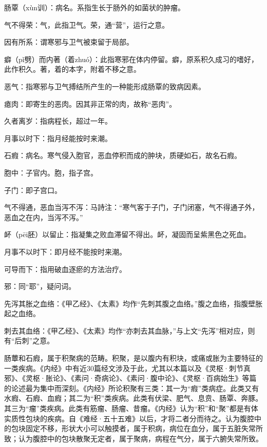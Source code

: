 \documentclass[draft,12pt]{ctexbook}
\begin{document}

\begin{jiaozhu}
  \item 肠覃（xùn训）：病名。系指生长于肠外的如菌状的肿瘤。
  \item 气不得荣：气，此指卫气。荣，通“营”，运行之意。
  \item 因有所系：谓寒邪与卫气被束留于局部。
  \item 癖（pǐ劈）而内著（着zhuó）：此指寒邪在体内停留。癖，原系积久成习的嗜好，此作积久。著，着的本字，附着不移之意。
  \item 恶气：指寒邪与卫气搏结所产生的一种能形成肠覃的致病因素。
  \item 瘜肉：即寄生的恶肉。因其非正常的肉，故称“恶肉”。
  \item 久者离岁：指病程长，超过一年。
  \item 月事以时下：指月经能按时来潮。
  \item 石瘕：病名。寒气侵入胞官，恶血停积而成的肿块，质硬如石，故名石瘕。
  \item 胞中：子官内。胞，指子宫。
  \item 子门：即子宫口。
  \item 气不得通，恶血当泻不泻：马詩注：“寒气客于子门，子门闭塞，气不得通子外，恶血之在内，当泻不泻。”
  \item 衃（pēi胚）以留止：指凝集之败血滞留不得出。衃，凝固而呈紫黑色之死血。
  \item 月事不以时下：即月经不能按时来潮。
  \item 可导而下：指用破血逐瘀的方法治疗。
  \item 邪：同“耶”，疑问词。
  \item 先泻其胀之血络：《甲乙经》、《太素》均作“先刺其腹之血络。”腹之血络，指腹壁胀起之血络。
  \item 刺去其血络：《甲乙经》、《太素》均作“亦刺去其血脉，”与上文“先泻”相对应，则有“后刺”之意。
\end{jiaozhu}


肠蕈和石瘕，属于积聚病的范畴。积聚，是以腹内有积块，或痛或胀为主要特征的一类疾病。《内经》中有近30篇经文涉及于此，尤其以本篇以及《灵枢·刺节真邪》、《灵枢·胀论》、《素问·奇病论》、《素问·腹中论》、《灵枢·百病始生》等篇的论述最为集中而深刻。《内经》所论积聚有三类：其一为“瘕”类病症。此类又有水瘕、石瘕、血瘕；其二为“积”类疾病。此类有伏梁、肥气、息贲、肠覃、奔豚。其三为“瘤”类疾病。此类有筋瘤、肠瘤、昔瘤。《内经》认为“积”和“聚”都是有体实质性包块的疾病。自《难经·五十五难》以后，才将二者分而待之。认为腹腔中的包块固定不移，形状大小可以触摸者，属于积病，病位在血分，属于五脏失常所致；认为腹腔中的包块散聚无定者，属于聚病，病程在气分，属于六腑失常所致。
\end{document}
